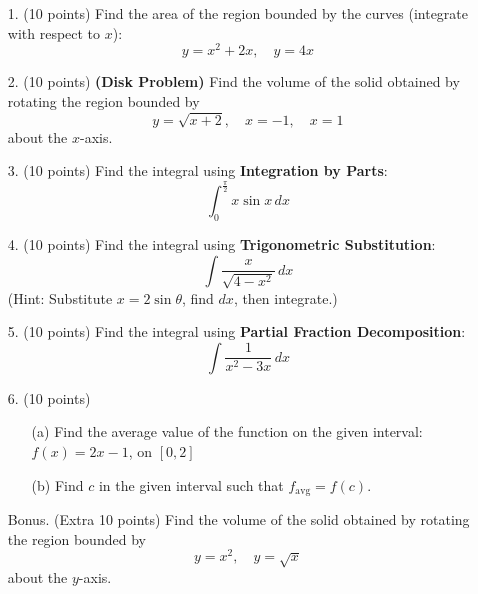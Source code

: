 \begin{enumerate}
    \item[1.] (10 points) Find the area of the region bounded by the curves (integrate with respect to $x$):\\
    \[
    y = x^2 + 2x, \quad y = 4x
    \]

    \item[2.] (10 points) \textbf{(Disk Problem)} Find the volume of the solid obtained by rotating the region bounded by\\
    \[
    y = \sqrt{x + 2}, \quad x = -1, \quad x = 1
    \]
    about the $x$-axis.
    \item[3.] (10 points) Find the integral using \textbf{Integration by Parts}:\\
    \[
    \int_0^{\frac{\pi}{2}} x \sin x \, dx
    \]
    \item[4.] (10 points) Find the integral using \textbf{Trigonometric Substitution}:\\
    \[
    \int \frac{x}{\sqrt{4 - x^2}} \, dx
    \]
    (Hint: Substitute $x = 2\sin\theta$, find $dx$, then integrate.)
    \item[5.] (10 points) Find the integral using \textbf{Partial Fraction Decomposition}:\\
    \[
    \int \frac{1}{x^2 - 3x} \, dx
    \]
    \item[6.] (10 points)
    \begin{itemize}
        \item[(a)] Find the average value of the function on the given interval: $f(x) = 2x - 1$, on $[0, 2]$
        \item[(b)] Find $c$ in the given interval such that $f_{\text{avg}} = f(c)$.
    \end{itemize}
    \item[Bonus.] (Extra 10 points) Find the volume of the solid obtained by rotating the region bounded by\\
    \[
    y = x^2, \quad y = \sqrt{x}
    \]
    about the $y$-axis.
\end{enumerate}